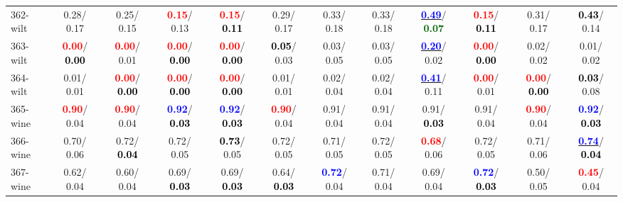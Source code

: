 \begin{table}[h]
\begin{center}
{\begin{tabular}{lc|c|c|c|c|c|c|c|c|c|c}
362-wilt &   0.28/  0.17 &   0.25/  0.15 & \textcolor{red}{\textbf{  0.15}}/  0.13 & \textcolor{red}{\textbf{  0.15}}/\textcolor{black}{\textbf{  0.11}} &   0.29/  0.17 &   0.33/  0.18 &   0.33/  0.18 & \underline{\textcolor{blue}{\textbf{  0.49}}}/\textcolor{darkgreen}{\textbf{  0.07}} & \textcolor{red}{\textbf{  0.15}}/\textcolor{black}{\textbf{  0.11}} &   0.31/  0.17 & \textcolor{black}{\textbf{  0.43}}/  0.14 \\
363-wilt & \textcolor{red}{\textbf{  0.00}}/\textcolor{black}{\textbf{  0.00}} & \textcolor{red}{\textbf{  0.00}}/  0.01 & \textcolor{red}{\textbf{  0.00}}/\textcolor{black}{\textbf{  0.00}} & \textcolor{red}{\textbf{  0.00}}/\textcolor{black}{\textbf{  0.00}} & \textcolor{black}{\textbf{  0.05}}/  0.03 &   0.03/  0.05 &   0.03/  0.05 & \underline{\textcolor{blue}{\textbf{  0.20}}}/  0.02 & \textcolor{red}{\textbf{  0.00}}/\textcolor{black}{\textbf{  0.00}} &   0.02/  0.02 &   0.01/  0.02 \\
364-wilt &   0.01/  0.01 & \textcolor{red}{\textbf{  0.00}}/\textcolor{black}{\textbf{  0.00}} & \textcolor{red}{\textbf{  0.00}}/\textcolor{black}{\textbf{  0.00}} & \textcolor{red}{\textbf{  0.00}}/\textcolor{black}{\textbf{  0.00}} &   0.01/  0.01 &   0.02/  0.04 &   0.02/  0.04 & \underline{\textcolor{blue}{\textbf{  0.41}}}/  0.11 & \textcolor{red}{\textbf{  0.00}}/  0.01 & \textcolor{red}{\textbf{  0.00}}/\textcolor{black}{\textbf{  0.00}} & \textcolor{black}{\textbf{  0.03}}/  0.08 \\
365-wine & \textcolor{red}{\textbf{  0.90}}/  0.04 & \textcolor{red}{\textbf{  0.90}}/  0.04 & \textcolor{blue}{\textbf{  0.92}}/\textcolor{black}{\textbf{  0.03}} & \textcolor{blue}{\textbf{  0.92}}/\textcolor{black}{\textbf{  0.03}} & \textcolor{red}{\textbf{  0.90}}/  0.04 &   0.91/  0.04 &   0.91/  0.04 &   0.91/\textcolor{black}{\textbf{  0.03}} &   0.91/  0.04 & \textcolor{red}{\textbf{  0.90}}/  0.04 & \textcolor{blue}{\textbf{  0.92}}/\textcolor{black}{\textbf{  0.03}} \\
366-wine &   0.70/  0.06 &   0.72/\textcolor{black}{\textbf{  0.04}} &   0.72/  0.05 & \textcolor{black}{\textbf{  0.73}}/  0.05 &   0.72/  0.05 &   0.71/  0.05 &   0.72/  0.05 & \textcolor{red}{\textbf{  0.68}}/  0.06 &   0.72/  0.05 &   0.71/  0.06 & \underline{\textcolor{blue}{\textbf{  0.74}}}/\textcolor{black}{\textbf{  0.04}} \\ \hline
367-wine &   0.62/  0.04 &   0.60/  0.04 &   0.69/\textcolor{black}{\textbf{  0.03}} &   0.69/\textcolor{black}{\textbf{  0.03}} &   0.64/\textcolor{black}{\textbf{  0.03}} & \textcolor{blue}{\textbf{  0.72}}/  0.04 &   0.71/  0.04 &   0.69/  0.04 & \textcolor{blue}{\textbf{  0.72}}/\textcolor{black}{\textbf{  0.03}} &   0.50/  0.05 & \textcolor{red}{\textbf{  0.45}}/  0.04 \\

\end{tabular}}
\end{center}
\end{table}
